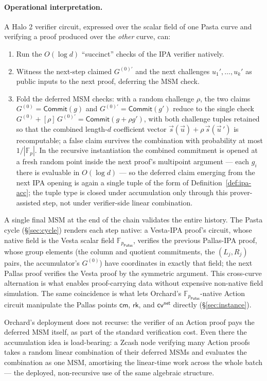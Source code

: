 \documentclass[11pt,a4paper]{article}
\theoremstyle{definition}
\newcommand{\F}{\mathbb{F}}
\newcommand{\Comm}{\mathsf{Commit}}
\newcommand{\cmsym}{\mathsf{cm}}
\newcommand{\cvsym}{\mathsf{cv}}
\newcommand{\rk}{\mathsf{rk}}
\newcommand{\Pallas}{\ensuremath{\mathsf{Pallas}}}
\begin{document}
\paragraph{Operational interpretation.}
A Halo 2 verifier circuit, expressed over the scalar field of one Pasta
curve and verifying a proof produced over the \emph{other} curve, can:
\begin{enumerate}[leftmargin=*]
\item Run the $O(\log d)$ ``succinct'' checks of the IPA verifier natively.
\item Witness the next-step claimed $G^{(0)\prime}$ and the next challenges
$u_1', \dots, u_k'$ as public inputs to the next proof, deferring the MSM
check.
\item Fold the deferred MSM checks: with a random challenge $\rho$, the
two claims $G^{(0)} = \Comm(g)$ and $G^{(0)\prime} = \Comm(g')$ reduce to
the single check $G^{(0)} + [\rho]\, G^{(0)\prime} = \Comm(g + \rho g')$,
with both challenge tuples retained so that the combined length-$d$
coefficient vector $\vec{s}(\vec{u}) + \rho\, \vec{s}(\vec{u}\,')$ is
recomputable; a false claim survives the combination with probability at
most $1/|\F_p|$. In the recursive instantiation the combined commitment
is opened at a fresh random point inside the next proof's multipoint
argument --- each $g_i$ there is evaluable in $O(\log d)$ --- so the
deferred claim emerging from the next IPA opening is again a single tuple
of the form of Definition~\ref{def:ipa-acc}; the tuple type is closed
under accumulation only through this prover-assisted step, not under
verifier-side linear combination.
\end{enumerate}
A single final MSM at the end of the chain validates the entire history.
The Pasta cycle (\S\ref{sec:cycle}) renders each step native: a
Vesta-IPA proof's circuit, whose native field is the Vesta scalar field
$\F_{p_{\Pallas}}$, verifies the previous Pallas-IPA proof, whose group
elements (the column and quotient commitments, the $(L_j, R_j)$ pairs,
the accumulator's $G^{(0)}$) have coordinates in exactly that field; the
next Pallas proof
verifies the Vesta proof by the symmetric argument. This cross-curve
alternation is what enables proof-carrying data without expensive
non-native field simulation. The same coincidence is what lets Orchard's
$\F_{p_{\Pallas}}$-native Action circuit manipulate the Pallas points
$\cmsym$, $\rk$, and $\cvsym^{\mathsf{net}}$ directly
(\S\ref{sec:instance}).

Orchard's deployment does not recurse: the verifier of an Action proof
pays the deferred MSM itself, as part of the standard verification cost.
Even there the accumulation idea is load-bearing: a Zcash node verifying
many Action proofs takes a random linear combination of their deferred
MSMs and evaluates the combination as one MSM, amortising the linear-time
work across the whole batch --- the deployed, non-recursive use of the
same algebraic structure.
\end{document}

